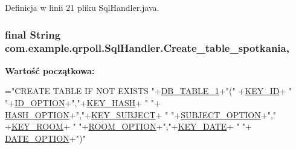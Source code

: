 Definicja w linii 21 pliku Sql\+Handler.\+java.

\hypertarget{classcom_1_1example_1_1qrpoll_1_1_sql_handler_a41cc7444128cfe954cd829ceb98d8df0}{
\subsubsection[{Create\+\_\+table\+\_\+spotkania}]{\setlength{\rightskip}{0pt plus 5cm}final String com.\+example.\+qrpoll.\+Sql\+Handler.\+Create\+\_\+table\+\_\+spotkania\hspace{0.3cm}{\ttfamily [static]}, {\ttfamily [private]}}}\label{classcom_1_1example_1_1qrpoll_1_1_sql_handler_a41cc7444128cfe954cd829ceb98d8df0}
{\bfseries Wartość początkowa\+:}
\begin{DoxyCode}
=\textcolor{stringliteral}{"CREATE TABLE IF NOT EXISTS "}+\hyperlink{classcom_1_1example_1_1qrpoll_1_1_sql_handler_a5858d638c1d649a755b4f18614481a48}{DB\_TABLE\_1}+\textcolor{stringliteral}{"("}
                +\hyperlink{classcom_1_1example_1_1qrpoll_1_1_sql_handler_ac68ddd9373f28e201126af152708a978}{KEY\_ID}+ \textcolor{stringliteral}{" "}+\hyperlink{classcom_1_1example_1_1qrpoll_1_1_sql_handler_aa5a0c822d90c20141ddadf6a396c332f}{ID\_OPTION}+\textcolor{stringliteral}{","}+\hyperlink{classcom_1_1example_1_1qrpoll_1_1_sql_handler_a300c5ab4aec2e6338f2ca3477c86821b}{KEY\_HASH}+ \textcolor{stringliteral}{" "}+
      \hyperlink{classcom_1_1example_1_1qrpoll_1_1_sql_handler_a5e06705347d09bc8a2a42b18b7ae2a39}{HASH\_OPTION}+\textcolor{stringliteral}{","}+\hyperlink{classcom_1_1example_1_1qrpoll_1_1_sql_handler_a5f388a6da5567ff51d36f49536889787}{KEY\_SUBJECT}+ \textcolor{stringliteral}{" "}+\hyperlink{classcom_1_1example_1_1qrpoll_1_1_sql_handler_a285e762c9eafe65d7fd408a27909fe31}{SUBJECT\_OPTION}+\textcolor{stringliteral}{","}
                +\hyperlink{classcom_1_1example_1_1qrpoll_1_1_sql_handler_a78fbe309193399fb67d76eadb67f4b33}{KEY\_ROOM}+ \textcolor{stringliteral}{" "}+\hyperlink{classcom_1_1example_1_1qrpoll_1_1_sql_handler_a7c6a68ef75025eb240b041ea3f005e46}{ROOM\_OPTION}+\textcolor{stringliteral}{","}+\hyperlink{classcom_1_1example_1_1qrpoll_1_1_sql_handler_a93e50d5f5a35250e6655f1d8f3192975}{KEY\_DATE}+ \textcolor{stringliteral}{" "}+
      \hyperlink{classcom_1_1example_1_1qrpoll_1_1_sql_handler_a1d7af0faf52a8e5ba92eac4595bbb94c}{DATE\_OPTION}+\textcolor{stringliteral}{")"}
\end{DoxyCode}


